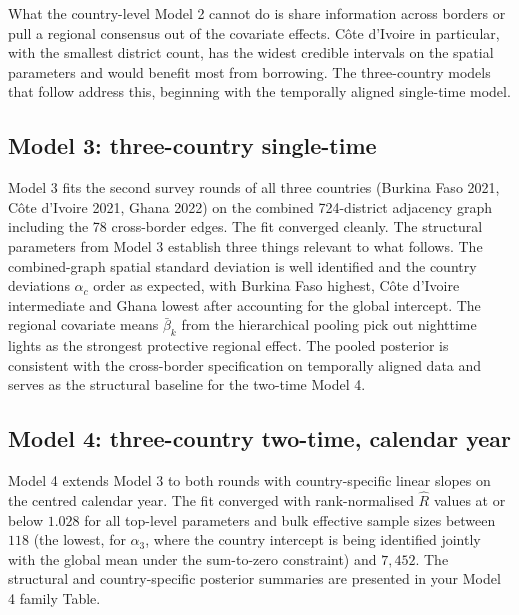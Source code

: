 \documentclass{article}
\begin{document}
What the country-level Model 2 cannot do is share information across
borders or pull a regional consensus out of the covariate effects. Côte
d'Ivoire in particular, with the smallest district count, has the widest
credible intervals on the spatial parameters and would benefit most from
borrowing. The three-country models that follow address this, beginning
with the temporally aligned single-time model.

\subsection{Model 3: three-country
single-time}\label{model-3-three-country-single-time-1}

Model 3 fits the second survey rounds of all three countries (Burkina
Faso 2021, Côte d'Ivoire 2021, Ghana 2022) on the combined 724-district
adjacency graph including the 78 cross-border edges. The fit converged
cleanly. The structural parameters from Model 3 establish three things
relevant to what follows. The combined-graph spatial standard deviation
is well identified and the country deviations \(\alpha_c\) order as
expected, with Burkina Faso highest, Côte d'Ivoire intermediate and
Ghana lowest after accounting for the global intercept. The regional
covariate means \(\bar{\beta}_k\) from the hierarchical pooling pick out
nighttime lights as the strongest protective regional effect. The pooled
posterior is consistent with the cross-border specification on
temporally aligned data and serves as the structural baseline for the
two-time Model 4.

\subsection{Model 4: three-country two-time, calendar
year}\label{model-4-three-country-two-time-calendar-year}

Model 4 extends Model 3 to both rounds with country-specific linear
slopes on the centred calendar year. The fit converged with
rank-normalised \(\hat{R}\) values at or below \(1.028\) for all
top-level parameters and bulk effective sample sizes between \(118\)
(the lowest, for \(\alpha_3\), where the country intercept is being
identified jointly with the global mean under the sum-to-zero
constraint) and \(7,452\). The structural and country-specific posterior
summaries are presented in your Model 4 family Table.
\end{document}
